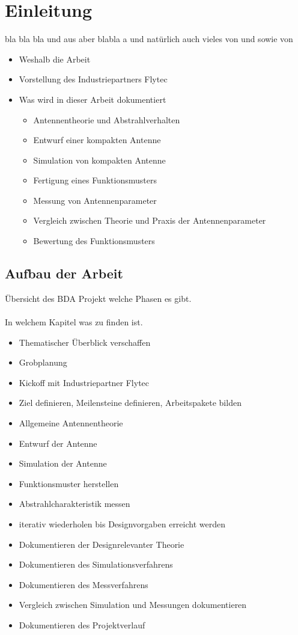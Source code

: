 \section{Einleitung}
bla bla bla \cite{meinke1992taschenbuch} und aus
\cite{kark2006antennen} aber  blabla a\cite{} und natürlich auch
\cite{gustrau2011hochfrequenztechnik} vieles von
\cite{elliott2003antenna} und \cite{emant} sowie von \cite{harrington1961time}
\begin{itemize}
\item Weshalb die Arbeit
\item Vorstellung des Industriepartners Flytec
\item Was wird in dieser Arbeit dokumentiert
	\begin{itemize}
		\item Antennentheorie und Abstrahlverhalten
		\item Entwurf einer kompakten Antenne
		\item Simulation von kompakten Antenne
		\item Fertigung eines Funktionsmusters
		\item Messung von Antennenparameter
		\item Vergleich zwischen Theorie und Praxis der Antennenparameter
		\item Bewertung des Funktionsmusters
	\end{itemize}
\end{itemize}
\subsection{Aufbau der Arbeit}
Übersicht des BDA Projekt welche Phasen es gibt.\\
\\
In welchem Kapitel was zu finden ist.\\
\begin{itemize}
\item Thematischer Überblick verschaffen
\item Grobplanung
\item Kickoff mit Industriepartner Flytec
\item Ziel definieren, Meilensteine definieren, Arbeitspakete bilden
\item Allgemeine Antennentheorie
\item Entwurf der Antenne
\item Simulation der Antenne
\item Funktionsmuster herstellen
\item Abstrahlcharakteristik messen
\item iterativ wiederholen bis Designvorgaben erreicht werden
\item Dokumentieren der Designrelevanter Theorie

\item Dokumentieren des Simulationsverfahrens
\item Dokumentieren des Messverfahrens
\item Vergleich zwischen Simulation und Messungen dokumentieren
\item Dokumentieren des Projektverlauf
\end{itemize}

